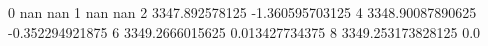0 nan nan
1 nan nan
2 3347.892578125 -1.360595703125
4 3348.90087890625 -0.352294921875
6 3349.2666015625 0.013427734375
8 3349.253173828125 0.0
